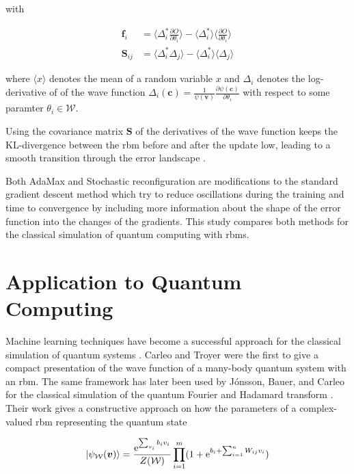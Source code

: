 with

\begin{align}
    \bm{f}_i &= \langle \Delta_i^* \frac{\partial O}{\partial \theta_i} \rangle - \langle \Delta_i^* \rangle \langle \frac{\partial O}{\partial \theta_i} \rangle \\
    \bm{S}_{ij} &= \langle \Delta_i^* \Delta_j \rangle - \langle \Delta_i^* \rangle \langle \Delta_j \rangle
\end{align}

where $\langle x \rangle$ denotes the mean of a random variable $x$ and $\Delta_i$ denotes the log-derivative of 
of the wave function $\Delta_i(\bm{c}) = \frac{1}{\psi(\bm{v})}\frac{\partial \psi(\bm{c})}{\partial \theta_i}$ with 
respect to some paramter $\theta_i \in \mathcal{W}$.

Using the covariance matrix $\bm{S}$ of the derivatives of the wave function keeps the KL-divergence between 
the \gls{rbm} before and after the update low, leading to a smooth transition through the error landscape \cite{sorella1998green}.

Both AdaMax and Stochastic reconfiguration are modifications to the standard gradient descent method which 
try to reduce oscillations during the training and time to convergence by including more information about the 
shape of the error function into the changes of the gradients. This study compares both methods for the classical simulation of quantum computing with \gls{rbm}s.

\section{Application to Quantum Computing}
\label{sec:applicationToQuantumComputing}
Machine learning techniques have become a successful approach for the classical simulation
of quantum systems \cite{carleo2017solving, deng2017quantum, carleo2018constructing}. 
Carleo and Troyer \cite{carleo2017solving} were the first to give a compact presentation of the wave function of a many-body quantum system with an \gls{rbm}.
The same framework has later been used by J\'{o}nsson, Bauer, and Carleo for the classical simulation of the quantum Fourier and Hadamard transform \cite{jnsson2018neuralnetwork}. Their work gives a constructive approach on how the parameters of a complex-valued \gls{rbm} representing the quantum state

\begin{equation}
   \Ket{\psi_{\mathcal{W}}(\bm{v})} = \frac{\mathrm{e}^{\sum_{v_i}b_iv_i}}{Z(\mathcal{W})}\prod_{i=1}^m(1+\mathrm{e}^{b_i + \sum_{i=1}^nW_{ij}v_i})
\end{equation}

